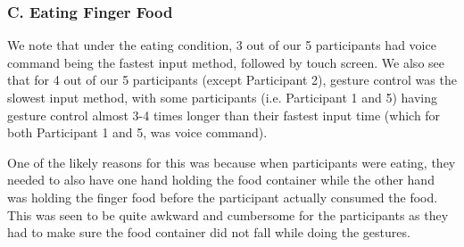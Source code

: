 \documentclass{sigchi}
\begin{document}
\subsubsection{C. Eating Finger Food}

\begin{table}[H] %
\centering
\caption{Times taken, in seconds, by each participant for each input method, eating finger food, when a request to intervene was issued}
\label{table:timeFingerfood}
\end{table}

We note that under the eating condition, 3 out of our 5 participants had voice command being the fastest input method, followed by touch screen. We also see that for 4 out of our 5 participants (except Participant 2), gesture control was the slowest input method, with some participants (i.e. Participant 1 and 5) having gesture control almost 3-4 times longer than their fastest input time (which for both Participant 1 and 5, was voice command).

One of the likely reasons for this was because when participants were eating, they needed to also have one hand holding the food container while the other hand was holding the finger food before the participant actually consumed the food. This was seen to be quite awkward and cumbersome for the participants as they had to make sure the food container did not fall while doing the gestures.
\end{document}
